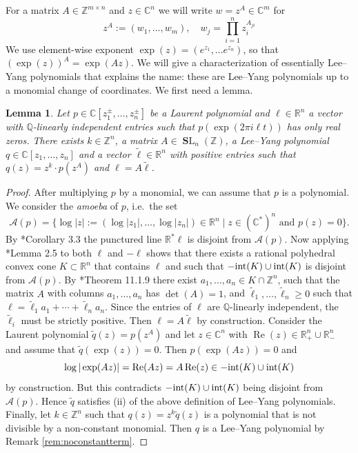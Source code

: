 \documentclass[11pt,letterpaper]{amsart}
\theoremstyle{definition}
\theoremstyle{plain}
\newtheorem{lem}[Def]{Lemma}
\newcommand{\Rea}{\operatorname{Re}}
\newcommand{\SL}{\operatorname{{\mathbf SL}}}
\newcommand{\cA}{{\mathcal A}}
\newcommand{\C}{{\mathbb C}}
\newcommand{\R}{{\mathbb R}}
\newcommand{\Q}{{\mathbb Q}}
\newcommand{\Z}{{\mathbb Z}}
\begin{document}
For a matrix $A\in\Z^{m\times n}$ and $z\in\C^n$ we will write $ w=z^{A} \in \mathbb{C}^{m} $ for  
\[z^{A}:=(w_{1},\ldots,w_{m}),\quad w_{j} = \prod_{i=1}^{n} z_{i}^{A_{ji}}\]
We use element-wise exponent $\exp(z)=(e^{z_{1}},\ldots e^{z_{n}})$, so that $(\exp(z))^{A}=\exp(Az)$.
We will give a characterization of essentially Lee--Yang polynomials that explains the name: these are Lee--Yang polynomials up to a monomial change of coordinates. We first need a lemma.
\begin{lem}\label{lem:denselinerealrootedessly}
    Let $p\in\C[z_1^{\pm},\ldots,z_n^{\pm}]$ be a Laurent polynomial and $\ell\in\R^n$ a vector with $\Q$-linearly independent entries such that $p(\exp(2\pi i\ell t))$ has only real zeros. There exists $k\in\Z^n$, a matrix $A\in\SL_n(\Z)$, a Lee--Yang polynomial $q\in\C[z_1,\ldots,z_n]$ and a vector $\tilde\ell\in\R^n$ with positive entries such that $q(z)=z^k\cdot p(z^A)$ and $\ell=A\tilde\ell$.
\end{lem}
\begin{proof}
    After multiplying $p$ by a monomial, we can assume that $p$ is a polynomial.
    We consider the \emph{amoeba} of $p$, i.e.~the set
    \begin{equation*}
        \cA(p)=\{\log|z|:=(\log|z_1|,\ldots,\log|z_n|)\in\R^n\mid z\in(\C^*)^n\textrm{ and } p(z)=0\}.
    \end{equation*}
    By \cite{AlonCohenVinzant}*{Corollary 3.3} the punctured line $\R^*\ell$ is disjoint from $\cA(p)$. Now applying \cite{AlonCohenVinzant}*{Lemma 2.5} to both $\ell$ and $-\ell$ shows that there exists a rational polyhedral convex cone $K\subset\R^n$ that contains $\ell$ and such that $-\textnormal{int}(K)\cup\textnormal{int}(K)$ is disjoint from $\cA(p)$. 
    By \cite{toric}*{Theorem 11.1.9} there exist $a_1,\ldots,a_n\in K\cap\Z^n$, such that the matrix $A$ with columns $a_1,\ldots,a_n$ has $\det(A)=1$, and $\tilde\ell_1,\ldots,\tilde\ell_n\geq0$ such that $\ell=\tilde\ell_1a_1+\cdots+\tilde\ell_na_n$. Since the entries of $\ell$ are $\Q$-linearly independent, the $\tilde\ell_i$ must be strictly positive. Then $\ell=A\tilde\ell$ by construction. Consider the Laurent polynomial $\tilde{q}(z)=p(z^A)$ and let $z\in\C^n$ with $\Rea(z)\in \R_{+}^n\cup\R_{-}^n$ and assume that $\tilde{q}(\exp(z))=0$. Then $p(\exp(Az))=0$ and $$\log|\exp(Az)|=\Rea(Az)=A\Rea(z)\in -\textnormal{int}(K)\cup\textnormal{int}(K)$$ by construction. But this  contradicts $-\textnormal{int}(K)\cup\textnormal{int}(K)$ being disjoint from $\cA(p)$. Hence $\tilde{q}$ satisfies (ii) of the above definition of Lee--Yang polynomials. Finally, let $k\in\Z^n$ such that $q(z)=z^k\tilde{q}(z)$ is a polynomial that is not divisible by a non-constant monomial. Then $q$ is a Lee--Yang polynomial by Remark \ref{rem:noconstantterm}.
\end{proof}
\end{document}
